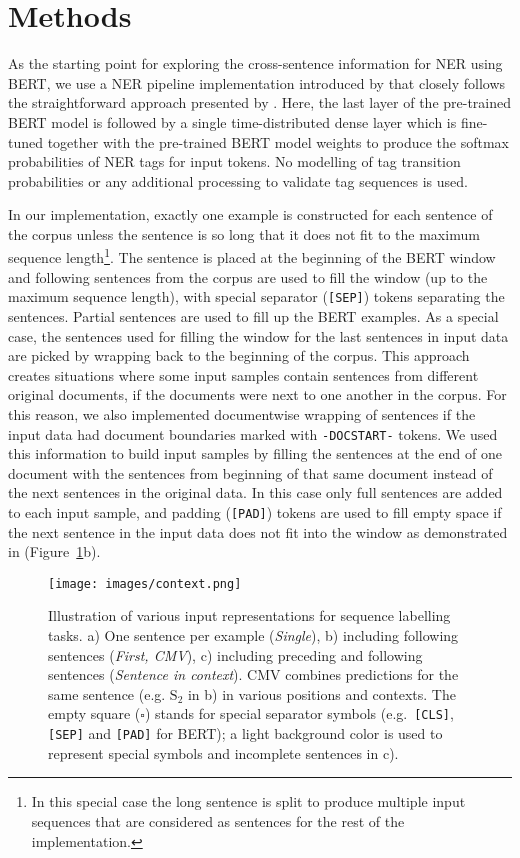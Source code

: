 \documentclass[11pt]{article}
\begin{document}
\section{Methods}
\label{sec:methods}

As the starting point for exploring the cross-sentence information for NER using BERT, we use a NER pipeline implementation introduced by  that closely follows the straightforward approach presented by . Here, the last layer of the pre-trained BERT model is followed by a single time-distributed dense layer which is fine-tuned together with the pre-trained BERT model weights to produce the softmax probabilities of NER tags for input tokens. No modelling of tag transition probabilities or any additional processing to validate tag sequences is used.

In our implementation, exactly one example is constructed for each sentence of the corpus unless the sentence is so long that it does not fit to the maximum sequence length\footnote{In this special case the long sentence is split to produce multiple input sequences that are considered as sentences for the rest of the implementation.}. The sentence is placed at the beginning of the BERT window and following sentences from the corpus are used to fill the window (up to the maximum sequence length), with special separator (\texttt{[SEP]}) tokens separating the sentences. Partial sentences are used to fill up the BERT examples. As a special case, the sentences used for filling the window for the last sentences in input data are picked by wrapping back to the beginning of the corpus. This approach creates situations where some input samples contain sentences from different original documents, if the documents were next to one another in the corpus. For this reason, we also implemented documentwise wrapping of sentences if the input data had document boundaries marked with \texttt{-DOCSTART-} tokens. We used this information to build input samples by filling the sentences at the end of one document with the sentences from beginning of that same document instead of the next sentences in the original data. In this case only full sentences are added to each input sample, and padding (\texttt{[PAD]}) tokens are used to fill empty space if the next sentence in the input data does not fit into the window as demonstrated in (Figure~\ref{fig:context}b).


\begin{figure}[!t]
\texttt{[image: images/context.png]}
\caption{Illustration of various input representations for sequence labelling tasks. a) One sentence per example (\emph{Single}), b) including following sentences (\emph{First, CMV}), c) including preceding and following sentences (\emph{Sentence in context}). CMV combines predictions for the same sentence (e.g. $\textrm{S}_2$ in b) in various positions and contexts. The empty square ({\small $\square$}) stands for special separator symbols (e.g.\ \texttt{[CLS]}, \texttt{[SEP]} and \texttt{[PAD]} for BERT); a light background color is used to represent special symbols and incomplete sentences in c).
}
\label{fig:context}
\end{figure}
\end{document}
